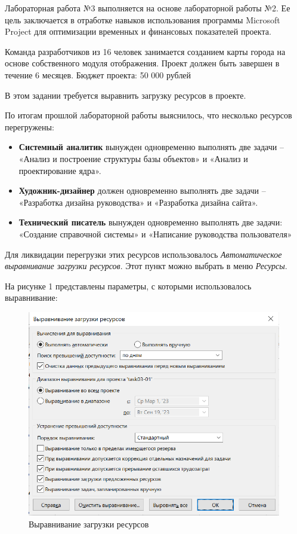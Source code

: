 Лабораторная работа №3 выполняется на основе лабораторной работы №2.
Ее цель заключается в отработке навыков использования программы Microsoft Project для оптимизации временных и финансовых показателей
проекта.

Команда разработчиков из 16 человек занимается созданием карты города на основе собственного модуля отображения. 
Проект должен быть завершен в течение 6 месяцев. Бюджет проекта: 50 000 рублей

\newpage
{}
В этом задании требуется выравнить загрузку ресурсов в проекте.

По итогам прошлой лабораторной работы выяснилось, что несколько ресурсов перегружены:
\begin{itemize}
	\item \textbf{Системный аналитик} вынужден одновременно выполнять две задачи – «Анализ и построение структуры базы объектов» и «Анализ и проектирование ядра».
	\item \textbf{Художник-дизайнер} должен одновременно выполнять две задачи – «Разработка дизайна руководства» и «Разработка дизайна сайта».
	\item \textbf{Технический писатель} вынужден одновременно выполнять две задачи: «Создание справочной системы» и «Написание руководства пользователя»
\end{itemize}

Для ликвидации перегрузки этих ресурсов использовалось \textit{Автоматическое выравнивание загрузки ресурсов}.
Этот пункт можно выбрать в меню \textit{Ресурсы}.

\newpage
На рисунке 1 представлены параметры, с которыми использовалось выравнивание:
\FloatBarrier
\begin{figure}[h]	
	\begin{center}
		\includegraphics[width=\linewidth, height=9cm]{inc/vyr.png}
	\end{center}
	\captionsetup{justification=centering}
	\caption{Выравнивание загрузки ресурсов}
\end{figure}
\FloatBarrier 

